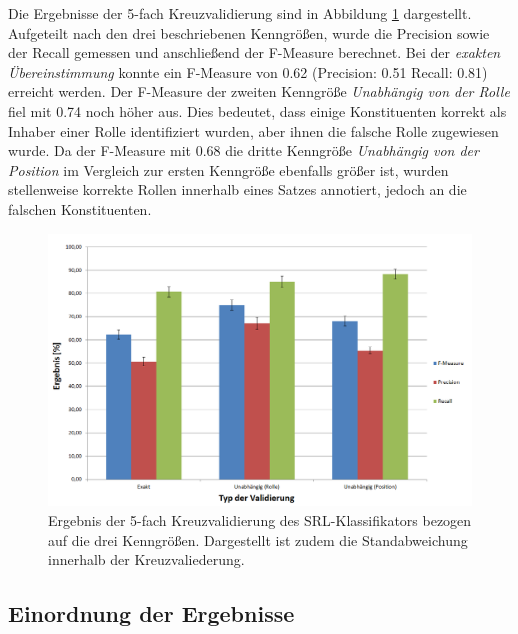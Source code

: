 \documentclass[12pt]{article}
\begin{document}
Die Ergebnisse der 5-fach Kreuzvalidierung sind in Abbildung \ref{evalKreuzvalidierung} dargestellt. Aufgeteilt nach den drei beschriebenen Kenngrößen, wurde die Precision sowie der Recall gemessen und anschließend der F-Measure berechnet. Bei der \textit{exakten Übereinstimmung} konnte ein F-Measure von 0.62 (Precision: 0.51 Recall: 0.81) erreicht werden. Der F-Measure der zweiten Kenngröße \textit{Unabhängig von der Rolle} fiel mit 0.74 noch höher aus. Dies bedeutet, dass einige Konstituenten korrekt als Inhaber einer Rolle identifiziert wurden, aber ihnen die falsche Rolle zugewiesen wurde. Da der F-Measure mit 0.68 die dritte Kenngröße \textit{Unabhängig von der Position} im Vergleich zur ersten Kenngröße ebenfalls größer ist, wurden stellenweise korrekte Rollen innerhalb eines Satzes annotiert, jedoch an die falschen Konstituenten. 


		\begin{figure}[tb!]
			\centering
			\includegraphics[scale=0.5]{images/ergebnisseKreuzvalidierung.png}
			\caption[Ergebnis der 5-fach Kreuzvalidierung]{Ergebnis der 5-fach Kreuzvalidierung des SRL-Klassifikators bezogen auf die drei Kenngrößen. Dargestellt ist zudem die Standabweichung innerhalb der Kreuzvaliederung.}
			\label{evalKreuzvalidierung}
		\end{figure}

\subsection{Einordnung der Ergebnisse}
		
\end{document}
